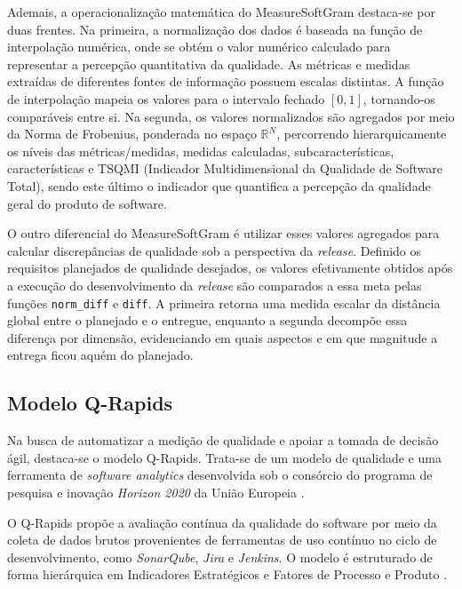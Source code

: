 Ademais, a operacionalização matemática do MeasureSoftGram destaca-se por duas frentes. Na primeira, a normalização dos dados é baseada na função de interpolação numérica, onde se obtém o valor numérico calculado para representar a percepção quantitativa da qualidade. As métricas e medidas extraídas de diferentes fontes de informação possuem escalas distintas. A função de interpolação mapeia os valores para o intervalo fechado $[0,1]$, tornando-os comparáveis entre si. Na segunda, os valores normalizados são agregados por meio da Norma de Frobenius, ponderada no espaço $\mathbb{R}^{N}$, percorrendo hierarquicamente os níveis das métricas/medidas, medidas calculadas, subcaracterísticas, características e TSQMI (Indicador Multidimensional da Qualidade de Software Total), sendo este último o indicador que quantifica a percepção da qualidade geral do produto de software. \cite{neri2020,neri2018}

O outro diferencial do MeasureSoftGram é utilizar esses valores agregados para calcular discrepâncias de qualidade sob a perspectiva da \textit{release}. Definido os requisitos planejados de qualidade desejados, os valores efetivamente obtidos após a execução do desenvolvimento da \textit{release} são comparados a essa meta pelas funções \texttt{norm\_diff} e \texttt{diff}. A primeira retorna uma medida escalar da distância global entre o planejado e o entregue, enquanto a segunda decompõe essa diferença por dimensão, evidenciando em quais aspectos e em que magnitude a entrega ficou aquém do planejado. \cite{neri2020,neri2018}

\subsection{Modelo Q-Rapids}
\label{sec:qrapids}

Na busca de automatizar a medição de qualidade e apoiar a tomada de decisão ágil, destaca-se o modelo Q-Rapids. Trata-se de um modelo de qualidade e uma ferramenta de \textit{software analytics} desenvolvida sob o consórcio do programa de pesquisa e inovação \textit{Horizon 2020} da União Europeia \cite{qrapids2019}.

O Q-Rapids propõe a avaliação contínua da qualidade do software por meio da coleta de dados brutos provenientes de ferramentas de uso contínuo no ciclo de desenvolvimento, como \textit{SonarQube}, \textit{Jira} e \textit{Jenkins}. O modelo é estruturado de forma hierárquica em Indicadores Estratégicos e Fatores de Processo e Produto \cite{qrapids2019}.


